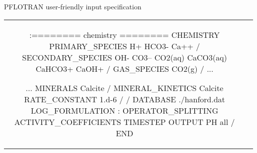 \documentclass{beamer}
\def\aligntop#1{\vtop{\null\hbox{#1}}}
\begin{document}
\begin{frame}{PFLOTRAN user-friendly input specification}
\footnotesize
\begin{tabular}{cc}
\begin{minipage}{0.5\textwidth}
\begin{semiverbatim}
:======== chemistry ========
CHEMISTRY
  PRIMARY_SPECIES
    H+
    HCO3-
    Ca++
  /
  SECONDARY_SPECIES
    OH-
    CO3--
    CO2(aq)
    CaCO3(aq)
    CaHCO3+
    CaOH+
  /
  GAS_SPECIES
    CO2(g)
  /
  ...
\end{semiverbatim}
\end{minipage}
\begin{minipage}{0.5\textwidth}
\begin{semiverbatim}
  ...
  MINERALS
    Calcite
  /
  MINERAL_KINETICS
    Calcite
      RATE_CONSTANT 1.d-6
    /
  /
  DATABASE ./hanford.dat
  LOG_FORMULATION
:  OPERATOR_SPLITTING
  ACTIVITY_COEFFICIENTS TIMESTEP
  OUTPUT
    PH
    all
  /
END
\end{semiverbatim}
\end{minipage}
\end{tabular}
\end{frame}

\end{document}
